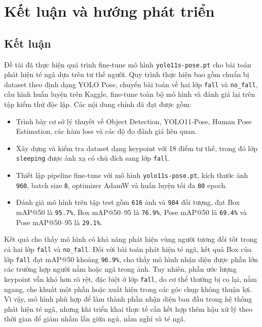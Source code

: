 \documentclass[12pt, a4paper]{article}
\begin{document}
\section{Kết luận và hướng phát triển}
\label{sec:conclusion}

\subsection{Kết luận}
Đề tài đã thực hiện quá trình fine-tune mô hình \texttt{yolo11s-pose.pt} cho bài toán phát hiện té ngã dựa trên tư thế người.
Quy trình thực hiện bao gồm chuẩn bị dataset theo định dạng YOLO Pose, chuyển bài toán về hai lớp \texttt{fall} và \texttt{no\_fall}, cấu hình huấn luyện trên Kaggle, fine-tune toàn bộ mô hình và đánh giá lại trên tập kiểm thử độc lập.
Các nội dung chính đã đạt được gồm:
\begin{itemize}[nosep]
  \item Trình bày cơ sở lý thuyết về Object Detection, YOLO11-Pose, Human Pose Estimation, các hàm loss và các độ đo đánh giá liên quan.
  \item Xây dựng và kiểm tra dataset dạng keypoint với 18 điểm tư thế, trong đó lớp \texttt{sleeping} được ánh xạ có chủ đích sang lớp \texttt{fall}.
  \item Thiết lập pipeline fine-tune với mô hình \texttt{yolo11s-pose.pt}, kích thước ảnh \texttt{960}, batch size \texttt{8}, optimizer AdamW và huấn luyện tối đa \texttt{80} epoch.
  \item Đánh giá mô hình trên tập test gồm \texttt{616} ảnh và \texttt{984} đối tượng, đạt Box mAP@50 là \texttt{95.7\%}, Box mAP@50--95 là \texttt{76.9\%}, Pose mAP@50 là \texttt{69.4\%} và Pose mAP@50--95 là \texttt{29.1\%}.
\end{itemize}

Kết quả cho thấy mô hình có khả năng phát hiện vùng người tương đối tốt trong cả hai lớp \texttt{fall} và \texttt{no\_fall}.
Đối với bài toán phát hiện té ngã, kết quả Box của lớp \texttt{fall} đạt mAP@50 khoảng \texttt{96.9\%}, cho thấy mô hình nhận diện được phần lớn các trường hợp người nằm hoặc ngã trong ảnh.
Tuy nhiên, phần ước lượng keypoint vẫn khó hơn rõ rệt, đặc biệt ở lớp \texttt{fall}, do cơ thể thường bị co lại, nằm ngang, che khuất một phần hoặc xuất hiện trong các góc chụp không thuận lợi.
Vì vậy, mô hình phù hợp để làm thành phần nhận diện ban đầu trong hệ thống phát hiện té ngã, nhưng khi triển khai thực tế cần kết hợp thêm hậu xử lý theo thời gian để giảm nhầm lẫn giữa ngủ, nằm nghỉ và té ngã.
\end{document}
